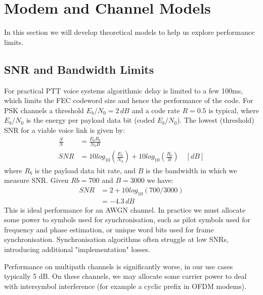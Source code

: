 \documentclass{article}
\begin{document}

\clearpage

\section{Modem and Channel Models}

In this section we will develop theoretical models to help us explore performance limits.

\subsection{SNR and Bandwidth Limits}

For practical PTT voice systems algorithmic delay is limited to a few 100ms, which limits the FEC codeword size and hence the performance of the code.  For PSK channels a threshold $E_b/N_0=2 \, \si{dB}$ and a code rate $R=0.5$ is typical, where $E_b/N_0$ is the energy per payload data bit (coded $E_b/N_0$).  The lowest (threshold) SNR for a viable voice link is given by:
\begin{equation}
\label{eq:snr}
\begin{split}
\frac{S}{N} &= \frac{E_bR_b}{N_0B} \\
SNR &= 10log_{10}\left(\frac{E_b}{N_0}\right) + 10log_{10}\left(\frac{R_b}{B}\right) \quad [\si{dB}]
\end{split}
\end{equation}
where $R_b$ is the payload data bit rate, and $B$ is the bandwidth in which we measure SNR.  Given $Rb=700$ and $B=3000$ we have:
\begin{equation}
\begin{split}
SNR &= 2 + 10log_{10}(700/3000) \\
    &= -4.3 \, \si{dB}
\end{split}
\end{equation}
This is ideal performance for an AWGN channel.  In practice we must allocate some power to symbols used for synchronisation, such as pilot symbols used for frequency and phase estimation, or unique word bits used for frame synchronisation.  Synchronisation algorithms often struggle at low SNRs, introducing additional "implementation" losses.

Performance on multipath channels is significantly worse, in our use cases typically 5 dB.  On these channels, we may allocate some carrier power to deal with intersymbol interference (for example a cyclic prefix in OFDM modems).
\end{document}

